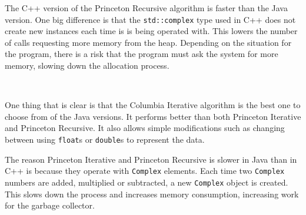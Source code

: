 The C++ version of the Princeton Recursive algorithm is faster than the Java version. One big difference is that the \texttt{std::complex} type used in C++ does not create new instances each time is is being operated with. This lowers the number of calls requesting more memory from the heap. Depending on the situation for the program, there is a risk that the program must ask the system for more memory, slowing down the allocation process.



\\

One thing that is clear is that the Columbia Iterative algorithm is the best one to choose from of the Java versions. It performs better than both Princeton Iterative and Princeton Recursive. It also allows simple modifications such as changing between using \texttt{float}s or  \texttt{double}s to represent the data.

The reason Princeton Iterative and Princeton Recursive is slower in Java than in C++ is because they operate with \texttt{Complex} elements. Each time two \texttt{Complex} numbers are added, multiplied or subtracted, a new \texttt{Complex} object is created. This slows down the process and increases memory consumption, increasing work for the garbage collector.


\\




